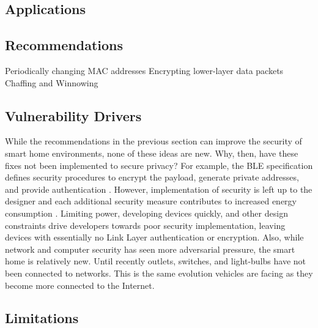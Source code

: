 \subsection{Applications}

\subsection{Recommendations}
Periodically changing MAC addresses
Encrypting lower-layer data packets
Chaffing and Winnowing

\subsection{Vulnerability Drivers}

While the recommendations in the previous section can improve the security of smart home environments, none of these ideas are new. Why, then, have these fixes not been implemented to secure privacy? For example, the \ac{BLE} specification defines security procedures to encrypt the payload, generate private addresses, and provide authentication \cite{sig4.2}. However, implementation of security is left up to the designer and each additional security measure contributes to increased energy consumption \cite{rHeydon}. Limiting power, developing devices quickly, and other design constraints drive developers towards poor security implementation, leaving devices with essentially no Link Layer authentication or encryption. Also, while network and computer security has seen more adversarial pressure, the smart home is relatively new. Until recently outlets, switches, and light-bulbs have not been connected to networks. This is the same evolution vehicles are facing as they become more connected to the Internet.

\subsection{Limitations}